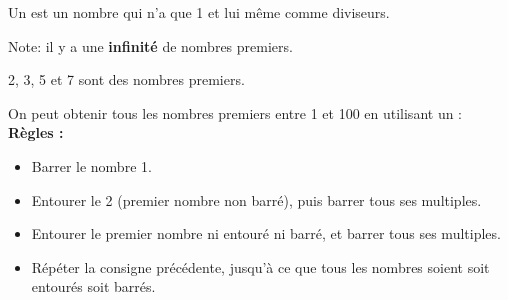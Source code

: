 \documentclass[../€Cours-complet/Cours-complet]{subfiles}
\begin{document}
\begin{cours}
	Un  est un nombre qui n'a que 1 et lui même comme diviseurs.
\end{cours}

Note: il y a une \textbf{infinité} de nombres premiers.

\begin{exemple}
	2, 3, 5 et 7 sont des nombres premiers.
\end{exemple}

\newpage

On peut obtenir tous les nombres premiers entre 1 et 100 en utilisant un  : \\

\textbf{Règles :}
\begin{itemize} \setlength\itemsep{0.3em}
	\item Barrer le nombre 1.
	\item Entourer le 2 (premier nombre non barré), puis barrer tous ses multiples.
	\item Entourer le premier nombre ni entouré ni barré, et barrer tous ses multiples.
	\item Répéter la consigne précédente, jusqu'à ce que tous les nombres soient soit entourés soit barrés.
\end{itemize}
\vspace{0.7cm}
\end{document}

